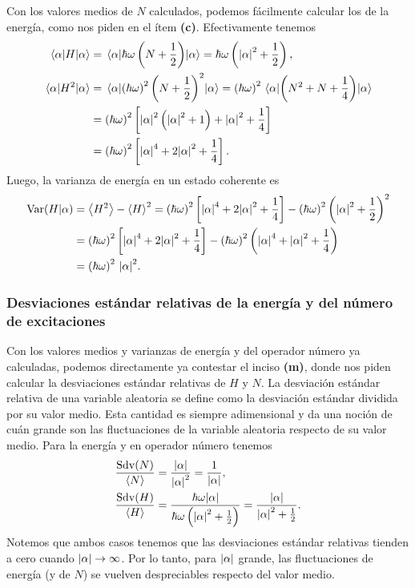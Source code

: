 \documentclass[10pt, a4paper]{article}
\newcommand{\N}{N}
\numberwithin{equation}{subsection}
\begin{document}
Con los valores medios de $\N$ calculados, podemos fácilmente calcular los de
la energía, como nos piden en el ítem \textbf{(c)}. Efectivamente tenemos
\begin{align}
  \expval{H}{\alpha} &= \expval{\hbar\omega\left(\N +
    \frac{1}{2}\right)}{\alpha} = \hbar\omega \left(\abs{\alpha}^2 +
    \frac{1}{2}\right), \label{eq:expval_H_alpha} \\
  \expval{H^2}{\alpha} &= \expval{\left(\hbar\omega\right)^2\left(\N +
    \frac{1}{2}\right)^2}{\alpha} = \left(\hbar\omega\right)^2
    \expval{\left(\N^2 + \N + \frac{1}{4}\right)}{\alpha} \nonumber \\
  &= \left(\hbar\omega\right)^2 \left[\abs{\alpha}^2\left(\abs{\alpha}^2 +
    1\right) + \abs{\alpha}^2 + \frac{1}{4}\right] \nonumber \\
  &= \left(\hbar\omega\right)^2 \left[\abs{\alpha}^4 + 2\abs{\alpha}^2 +
    \frac{1}{4}\right].
\end{align}
Luego, la varianza de energía en un estado coherente es
\begin{align}
  \Var(H|\alpha) &= \expval{H^2} - \expval{H}^2 = \left(\hbar\omega\right)^2
    \left[\abs{\alpha}^4 + 2\abs{\alpha}^2 + \frac{1}{4}\right] -
    \left(\hbar\omega\right)^2\left(\abs{\alpha}^2 + \frac{1}{2}\right)^2
    \nonumber \\
  &= \left(\hbar\omega\right)^2 \left[\abs{\alpha}^4 + 2\abs{\alpha}^2 +
    \frac{1}{4}\right] - \left(\hbar\omega\right)^2\left(\abs{\alpha}^4 +
    \abs{\alpha}^2 + \frac{1}{4}\right) \nonumber \\
  &= \left(\hbar\omega\right)^2 \,\abs{\alpha}^2.
\end{align}

\subsubsection{Desviaciones estándar relativas de la energía y del número de
  excitaciones}

Con los valores medios y varianzas de energía y del operador número ya
calculadas, podemos directamente ya contestar el inciso \textbf{(m)}, donde nos
piden calcular la desviaciones estándar relativas de $H$ y $\N$. La desviación
estándar relativa de una variable aleatoria se define como la desviación
estándar dividida por su valor medio. Esta cantidad es siempre adimensional y
da una noción de cuán grande son las fluctuaciones de la variable aleatoria
respecto de su valor medio. Para la energía y en operador número tenemos
\begin{align}
  \frac{\Sdv(\N)}{\expval{\N}} &= \frac{\abs{\alpha}}{\abs{\alpha}^2} =
    \frac{1}{\abs{\alpha}}, \\
  \frac{\Sdv(H)}{\expval{H}} &= \frac{\hbar\omega\abs{\alpha}}
    {\hbar\omega\left(\abs{\alpha}^2 + \frac{1}{2}\right)} =
    \frac{\abs{\alpha}} {\abs{\alpha}^2 + \frac{1}{2}}.
\end{align}
Notemos que ambos casos tenemos que las desviaciones estándar relativas tienden
a cero cuando $\abs{\alpha} \to \infty$. Por lo tanto, para $\abs{\alpha}$
grande, las fluctuaciones de energía (y de $\N$) se vuelven despreciables
respecto del valor medio.
\end{document}
